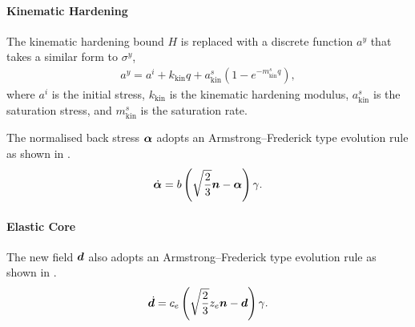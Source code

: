     \paragraph{Kinematic Hardening}
    The kinematic hardening bound $H$ is replaced with a discrete function $a^y$ that takes a similar form to $\sigma^y$,
    \begin{gather}\label{eq:kin_bone}
        a^y=a^i+k_\text{kin}q+a^s_\text{kin}\left(1-e^{-m^s_\text{kin}q}\right),
    \end{gather}
    where $a^i$ is the initial stress, $k_\text{kin}$ is the kinematic hardening modulus, $a^s_\text{kin}$ is the saturation stress, and $m^s_\text{kin}$ is the saturation rate.
    
    The normalised back stress $\bm{\alpha}$ adopts an Armstrong--Frederick type \citep{Frederick2007} evolution rule as shown in .
    \begin{gather}
        \dot{\bm{\alpha}}=b\left(\sqrt{\dfrac{2}{3}}\bm{n}-\bm{\alpha}\right)\gamma.
    \end{gather}
    \paragraph{Elastic Core}
    The new field $\bm{d}$ also adopts an Armstrong--Frederick type evolution rule as shown in .
    \begin{gather}
    \dot{\bm{d}}=c_e\left(\sqrt{\dfrac{2}{3}}z_e\bm{n}-\bm{d}\right)\gamma.
\end{gather}
